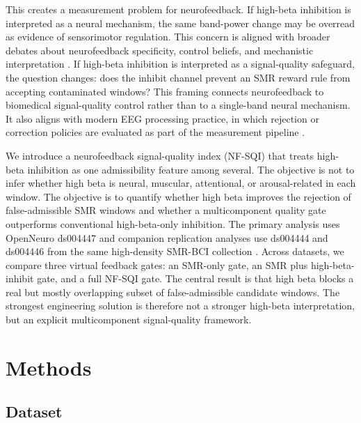 \documentclass[preprint,12pt]{elsarticle}
\begin{document}
This creates a measurement problem for neurofeedback. If high-beta inhibition is interpreted as a neural mechanism, the same band-power change may be overread as evidence of sensorimotor regulation. This concern is aligned with broader debates about neurofeedback specificity, control beliefs, and mechanistic interpretation \citep{Thibault2016SelfRegulating,Witte2013ControlBeliefs}. If high-beta inhibition is interpreted as a signal-quality safeguard, the question changes: does the inhibit channel prevent an SMR reward rule from accepting contaminated windows? This framing connects neurofeedback to biomedical signal-quality control rather than to a single-band neural mechanism. It also aligns with modern EEG processing practice, in which rejection or correction policies are evaluated as part of the measurement pipeline \citep{Jas2017Autoreject,BigdelyShamlo2015PREP,Delorme2004EEGLAB,Gramfort2013MNE}.

We introduce a neurofeedback signal-quality index (NF-SQI) that treats high-beta inhibition as one admissibility feature among several. The objective is not to infer whether high beta is neural, muscular, attentional, or arousal-related in each window. The objective is to quantify whether high beta improves the rejection of false-admissible SMR windows and whether a multicomponent quality gate outperforms conventional high-beta-only inhibition. The primary analysis uses OpenNeuro ds004447 and companion replication analyses use ds004444 and ds004446 from the same high-density SMR-BCI collection \citep{Iwama2023HDEEG,OpenNeuroDS004444,OpenNeuroDS004446,OpenNeuroDS004447}. Across datasets, we compare three virtual feedback gates: an SMR-only gate, an SMR plus high-beta-inhibit gate, and a full NF-SQI gate. The central result is that high beta blocks a real but mostly overlapping subset of false-admissible candidate windows. The strongest engineering solution is therefore not a stronger high-beta interpretation, but an explicit multicomponent signal-quality framework.

\section{Methods}

\subsection{Dataset}
\end{document}
